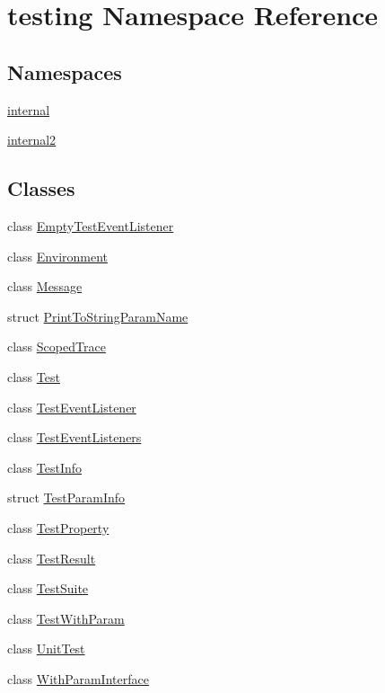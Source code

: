 \hypertarget{namespacetesting}{}\section{testing Namespace Reference}
\label{namespacetesting}
\subsection*{Namespaces}
\begin{DoxyCompactItemize}
\item 
 \hyperlink{namespacetesting_1_1internal}{internal}
\item 
 \hyperlink{namespacetesting_1_1internal2}{internal2}
\end{DoxyCompactItemize}
\subsection*{Classes}
\begin{DoxyCompactItemize}
\item 
class \hyperlink{classtesting_1_1EmptyTestEventListener}{Empty\+Test\+Event\+Listener}
\item 
class \hyperlink{classtesting_1_1Environment}{Environment}
\item 
class \hyperlink{classtesting_1_1Message}{Message}
\item 
struct \hyperlink{structtesting_1_1PrintToStringParamName}{Print\+To\+String\+Param\+Name}
\item 
class \hyperlink{classtesting_1_1ScopedTrace}{Scoped\+Trace}
\item 
class \hyperlink{classtesting_1_1Test}{Test}
\item 
class \hyperlink{classtesting_1_1TestEventListener}{Test\+Event\+Listener}
\item 
class \hyperlink{classtesting_1_1TestEventListeners}{Test\+Event\+Listeners}
\item 
class \hyperlink{classtesting_1_1TestInfo}{Test\+Info}
\item 
struct \hyperlink{structtesting_1_1TestParamInfo}{Test\+Param\+Info}
\item 
class \hyperlink{classtesting_1_1TestProperty}{Test\+Property}
\item 
class \hyperlink{classtesting_1_1TestResult}{Test\+Result}
\item 
class \hyperlink{classtesting_1_1TestSuite}{Test\+Suite}
\item 
class \hyperlink{classtesting_1_1TestWithParam}{Test\+With\+Param}
\item 
class \hyperlink{classtesting_1_1UnitTest}{Unit\+Test}
\item 
class \hyperlink{classtesting_1_1WithParamInterface}{With\+Param\+Interface}
\end{DoxyCompactItemize}
